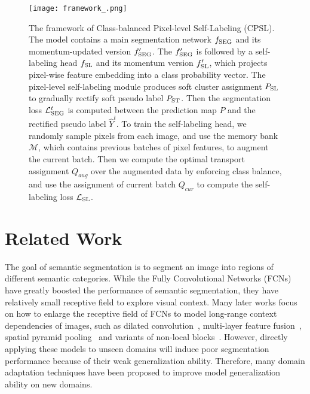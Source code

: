 \documentclass[10pt,twocolumn,letterpaper]{article}
\begin{document}
	
\begin{figure*}
		\centering
		\texttt{[image: framework\_.png]}\\
		\caption{The framework of Class-balanced Pixel-level Self-Labeling (CPSL). The model contains a main segmentation network $f_{\rm SEG}$ and its momentum-updated version $f'_{\rm SEG}$. The $f'_{\rm SEG}$ is followed by a self-labeling head $f_{\rm{SL}}$ and its momentum version $f_{\rm{SL}}'$, which projects pixel-wise feature embedding into a class probability vector. The pixel-level self-labeling module produces soft cluster assignment $P_{\rm SL}$ to gradually rectify soft pseudo label $P_{\rm ST}$. Then the segmentation loss $\mathcal{L}_{\rm SEG}^t$ is computed between the prediction map $P$ and the rectified pseudo label $\hat{Y}^t$. To train the self-labeling head, we randomly sample pixels from each image, and use the memory bank $\mathcal{M}$, which contains previous batches of pixel features, to augment the current batch. Then we compute the optimal transport assignment $Q_{aug}$ over the augmented data by enforcing class balance, and use the assignment of current batch $Q_{cur}$ to compute the self-labeling loss $\mathcal{L}_{\rm SL}$.}
		\label{0fig1}
		\vspace{-0.5em}
	\end{figure*}
	\section{Related Work}
	 The goal of semantic segmentation is to segment an image into regions of different semantic categories. While the Fully Convolutional Networks (FCNs) \cite{long2015fully} have greatly boosted the performance of semantic segmentation, they have relatively small receptive field to explore visual context. Many later works focus on how to enlarge the receptive field of FCNs to model long-range context dependencies of images, such as dilated convolution~\cite{chen2017deeplab}, multi-layer feature fusion~\cite{lin2017refinenet}, spatial pyramid pooling~\cite{zhao2017pyramid} and variants of non-local blocks~\cite{fu2019dual,huang2019ccnet,hu2018squeeze}.
	However, directly applying these models to unseen domains will induce poor segmentation performance because of their weak generalization ability. Therefore, many domain adaptation techniques have been proposed to improve model generalization ability on new domains. 
	
\end{document}
